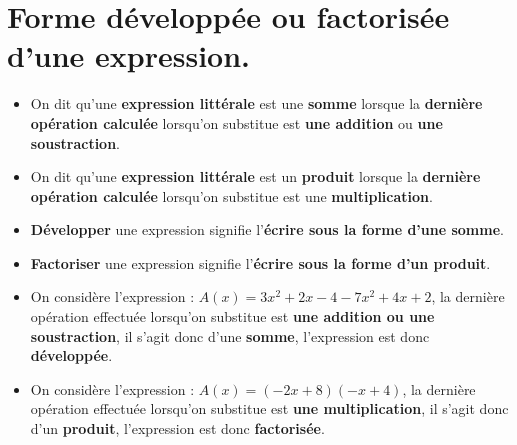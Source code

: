 \documentclass[a4paper,dvipsnames]{article}
\begin{document}
\section{Forme développée ou factorisée d'une expression.}

\begin{Def}
\begin{itemize}
\item On dit qu'une \textbf{expression littérale} est une \textbf{somme} lorsque la \textbf{dernière opération calculée} lorsqu'on substitue est \textbf{une addition} ou \textbf{une soustraction}.
\item On dit qu'une \textbf{expression littérale} est un \textbf{produit} lorsque la \textbf{dernière opération calculée} lorsqu'on substitue est une \textbf{multiplication}.
\end{itemize}
\end{Def}

\begin{Ex}
\end{Ex}

\begin{Def}
\begin{itemize}
\item \textbf{Développer} une expression signifie l'\textbf{écrire sous la forme d'une somme}.
\item \textbf{Factoriser} une expression signifie l'\textbf{écrire sous la forme d'un produit}.
\end{itemize}
\end{Def}

\begin{Ex}
\begin{itemize}
\item On considère l'expression : $A(x)=3x^2+2x-4-7x^2+4x+2$, la dernière opération effectuée lorsqu'on substitue est \textbf{une addition ou une soustraction}, il s'agit donc d'une \textbf{somme}, l'expression est donc \textbf{développée}.
\item On considère l'expression : $A(x)=(-2x+8)(-x+4)$, la dernière opération effectuée lorsqu'on substitue est \textbf{une multiplication}, il s'agit donc d'un \textbf{produit}, l'expression est donc \textbf{factorisée}.
\end{itemize}
\end{Ex}
\end{document}
